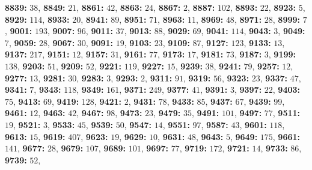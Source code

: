 \textsf{\bfseries 8839:} $38$, \textsf{\bfseries 8849:} $21$, \textsf{\bfseries 8861:} $42$, \textsf{\bfseries 8863:} $24$, \textsf{\bfseries 8867:} $2$, \textsf{\bfseries 8887:} $102$, \textsf{\bfseries 8893:} $22$, \textsf{\bfseries 8923:} $5$, \textsf{\bfseries 8929:} $114$, \textsf{\bfseries 8933:} $20$, \textsf{\bfseries 8941:} $89$, \textsf{\bfseries 8951:} $71$, \textsf{\bfseries 8963:} $11$, \textsf{\bfseries 8969:} $48$, \textsf{\bfseries 8971:} $28$, \textsf{\bfseries 8999:} $7$, \textsf{\bfseries 9001:} $193$, \textsf{\bfseries 9007:} $96$, \textsf{\bfseries 9011:} $37$, \textsf{\bfseries 9013:} $88$, \textsf{\bfseries 9029:} $69$, \textsf{\bfseries 9041:} $114$, \textsf{\bfseries 9043:} $3$, \textsf{\bfseries 9049:} $7$, \textsf{\bfseries 9059:} $28$, \textsf{\bfseries 9067:} $30$, \textsf{\bfseries 9091:} $19$, \textsf{\bfseries 9103:} $23$, \textsf{\bfseries 9109:} $87$, \textsf{\bfseries 9127:} $123$, \textsf{\bfseries 9133:} $13$, \textsf{\bfseries 9137:} $217$, \textsf{\bfseries 9151:} $12$, \textsf{\bfseries 9157:} $31$, \textsf{\bfseries 9161:} $77$, \textsf{\bfseries 9173:} $17$, \textsf{\bfseries 9181:} $73$, \textsf{\bfseries 9187:} $3$, \textsf{\bfseries 9199:} $138$, \textsf{\bfseries 9203:} $51$, \textsf{\bfseries 9209:} $52$, \textsf{\bfseries 9221:} $119$, \textsf{\bfseries 9227:} $15$, \textsf{\bfseries 9239:} $38$, \textsf{\bfseries 9241:} $79$, \textsf{\bfseries 9257:} $12$, \textsf{\bfseries 9277:} $13$, \textsf{\bfseries 9281:} $30$, \textsf{\bfseries 9283:} $3$, \textsf{\bfseries 9293:} $2$, \textsf{\bfseries 9311:} $91$, \textsf{\bfseries 9319:} $56$, \textsf{\bfseries 9323:} $23$, \textsf{\bfseries 9337:} $47$, \textsf{\bfseries 9341:} $7$, \textsf{\bfseries 9343:} $118$, \textsf{\bfseries 9349:} $161$, \textsf{\bfseries 9371:} $249$, \textsf{\bfseries 9377:} $41$, \textsf{\bfseries 9391:} $3$, \textsf{\bfseries 9397:} $22$, \textsf{\bfseries 9403:} $75$, \textsf{\bfseries 9413:} $69$, \textsf{\bfseries 9419:} $128$, \textsf{\bfseries 9421:} $2$, \textsf{\bfseries 9431:} $78$, \textsf{\bfseries 9433:} $85$, \textsf{\bfseries 9437:} $67$, \textsf{\bfseries 9439:} $99$, \textsf{\bfseries 9461:} $12$, \textsf{\bfseries 9463:} $42$, \textsf{\bfseries 9467:} $98$, \textsf{\bfseries 9473:} $23$, \textsf{\bfseries 9479:} $35$, \textsf{\bfseries 9491:} $101$, \textsf{\bfseries 9497:} $77$, \textsf{\bfseries 9511:} $19$, \textsf{\bfseries 9521:} $3$, \textsf{\bfseries 9533:} $45$, \textsf{\bfseries 9539:} $50$, \textsf{\bfseries 9547:} $14$, \textsf{\bfseries 9551:} $97$, \textsf{\bfseries 9587:} $43$, \textsf{\bfseries 9601:} $118$, \textsf{\bfseries 9613:} $15$, \textsf{\bfseries 9619:} $407$, \textsf{\bfseries 9623:} $19$, \textsf{\bfseries 9629:} $10$, \textsf{\bfseries 9631:} $48$, \textsf{\bfseries 9643:} $5$, \textsf{\bfseries 9649:} $175$, \textsf{\bfseries 9661:} $141$, \textsf{\bfseries 9677:} $28$, \textsf{\bfseries 9679:} $107$, \textsf{\bfseries 9689:} $101$, \textsf{\bfseries 9697:} $77$, \textsf{\bfseries 9719:} $172$, \textsf{\bfseries 9721:} $14$, \textsf{\bfseries 9733:} $86$, \textsf{\bfseries 9739:} $52$, 
